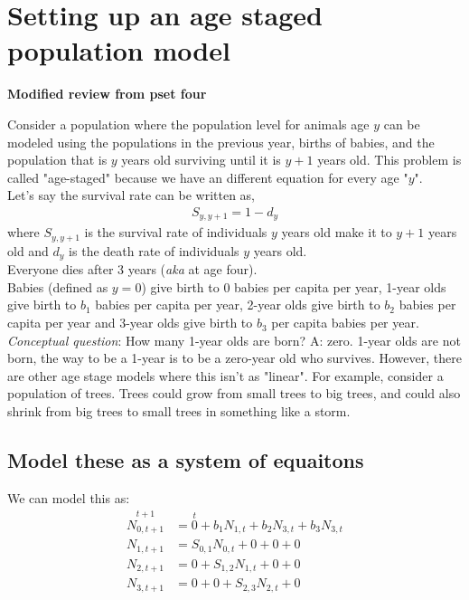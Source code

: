 \documentclass{article}
\begin{document}
\section{Setting up an age staged population model}
\textbf{Modified review from pset four}

Consider a population where the population level for animals age $y$ can be modeled using the populations in the previous year, births of babies, and the population that is $y$ years old surviving until it is $y+1$ years old. This problem is called "age-staged" because we have an different equation for every age "$y$". \\

Let's say the survival rate can be written as,
\begin{align}
    S_{y, y+1} = 1-d_y
\end{align}
where $S_{y, y+1}$ is the survival rate of individuals $y$ years old make it to $y+1$ years old and $d_y$ is the death rate of individuals $y$ years old.\\

Everyone dies after 3 years (\textit{aka} at age four). \\

Babies (defined as $y = 0$) give birth to $0$ babies per capita per year, 1-year olds give birth to $b_1$ babies per capita per year, 2-year olds give birth to $b_2$ babies per capita per year and 3-year olds give birth to $b_3$ per capita babies per year.\\

\textit{Conceptual question}: How many 1-year olds are born? A: zero. 1-year olds are not born, the way to be a 1-year is to be a zero-year old who survives. However, there are other age stage models where this isn't as "linear". For example, consider a population of trees. Trees could grow from small trees to big trees, and could also shrink from big trees to small trees in something like a storm.  

\subsection{Model these as a system of equaitons}

We can model this as:
\begin{align}
    \overset{t+1}{N_{0, t+1}} &= \overset{t}{0} + b_1  N_{1, t}+ b_2  N_{3, t} + b_3  N_{3, t}\\
    N_{1, t+1} &= S_{0,1} N_{0, t} + 0 + 0 + 0\\
    N_{2, t+1} &= 0+ S_{1,2} N_{1, t}+ 0 + 0\\
    N_{3, t+1} &= 0 + 0 + S_{2,3} N_{2, t} + 0
\end{align}
\end{document}
